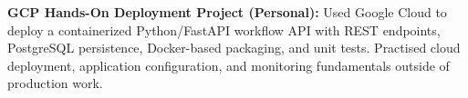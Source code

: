 
\textbf{GCP Hands-On Deployment Project (Personal):} Used Google Cloud to deploy a containerized Python/FastAPI workflow API with REST endpoints, PostgreSQL persistence, Docker-based packaging, and unit tests. Practised cloud deployment, application configuration, and monitoring fundamentals outside of production work.
